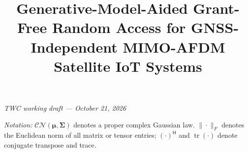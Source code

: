 \documentclass[10pt,journal,onecolumn]{IEEEtran}
\title{Generative-Model-Aided Grant-Free Random Access for GNSS-Independent MIMO-AFDM Satellite IoT Systems}
\author{}
\newcommand{\CN}{\mathcal{CN}}
\newcommand{\tr}{\operatorname{tr}}
\begin{document}
\maketitle
\begin{center}
\small\textit{TWC working draft --- October 21, 2026}
\end{center}



\noindent\textit{Notation:} $\CN(\bm\mu,\bm\Sigma)$ denotes a proper complex Gaussian law.
$\|\cdot\|_F$ denotes the Euclidean norm of all matrix or tensor entries;
$(\cdot)^{\mathsf H}$ and $\tr(\cdot)$ denote conjugate transpose and trace.





% 
% 

\appendices
{}





\end{document}
